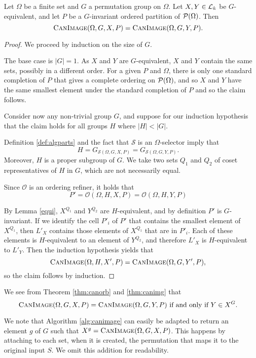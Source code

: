 \begin{thm}\label{thm:canimg}
  Let $\Omega$ be a finite set and $G$ a permutation group on $\Omega$.
  Let $X,Y\in\mathcal{L}_k$ be $G$-equivalent, and let $P$ be a $G$-invariant ordered
  partition of $\mathcal{P}(\Omega)$. Then
  \[
    \textsc{CanImage}(\Omega,G,X,P) =
    \textsc{CanImage}(\Omega,G,Y,P).
  \]
\end{thm}
\begin{proof}
  We proceed by induction on the size of $G$. %

  The base case is $|G| = 1$. As \(X\) and \(Y\) are \(G\)-equivalent, \(X\) and
  \(Y\) contain the same sets, possibly in a different order. For a given \(P\)
  and \(\Omega\), there is only one standard completion of \(P\) that gives a
  complete ordering on \(\mathcal{P}(\Omega)\), and so \(X\) and \(Y\) have the same
  smallest element under the standard completion of \(P\) and so the claim
  follows.

  Consider now any non-trivial group $G$, and suppose for our induction hypothesis that the claim holds for
  all groups $H$ where $|H| < |G|$.

  Definition \ref{def:algparts} and the fact that $\mathcal{S}$ is an
  $\Omega$-selector imply that
  \[
    H = G_{\mathcal{S}(\Omega,G,X,P)} = G_{\mathcal{S}(\Omega,G,Y,P)}.
  \]
  Moreover, $H$ is a proper subgroup of $G$. We take two sets $Q_1$ and $Q_2$ of
  coset representatives of $H$ in $G$, which are not necessarily equal.

  Since $\mathcal{O}$ is an ordering refiner, it holds that
  \[
    P' = \mathcal{O}(\Omega,H,X,P) = \mathcal{O}(\Omega,H,Y,P)
  \]

  By Lemma \ref{equi}, \(X^{Q_1}\) and \(Y^{Q_2}\) are \(H\)-equivalent, and by
  definition \(P'\) is $G$-invariant. If we identify the cell \(P'_i\) of \(P'\) that
  contains the smallest element of \(X^{Q_1}\), then \(L'_X\) contains those
  elements of \(X^{Q_1}\) that are in \(P'_i\). Each of these elements is
  \(H\)-equivalent to an element of \(Y^{Q_2}\), and therefore \(L'_X\) is
  \(H\)-equivalent to \(L'_Y\). Then the induction hypothesis yields that
  \[
    \textsc{CanImage}(\Omega, H, X',P) = \textsc{CanImage}(\Omega, G, Y',P),
  \]
  so the claim follows by induction.
\end{proof}

We see from Theorem \ref{thm:canorb} and \ref{thm:canimg} that
$$\textsc{CanImage}(\Omega,G,X,P) = \textsc{CanImage}(\Omega,G,Y,P)
\text{~if and only if~} Y \in X^G.$$

We note that Algorithm \ref{alg:canimage} can easily be adapted to return an
element $g$ of $G$ such that $X^g = \textsc{CanImage}(\Omega,G,X,P)$. This happens by
attaching to each set, when it is created, the permutation that maps it to the
original input \(S\). We omit this addition for readability.
